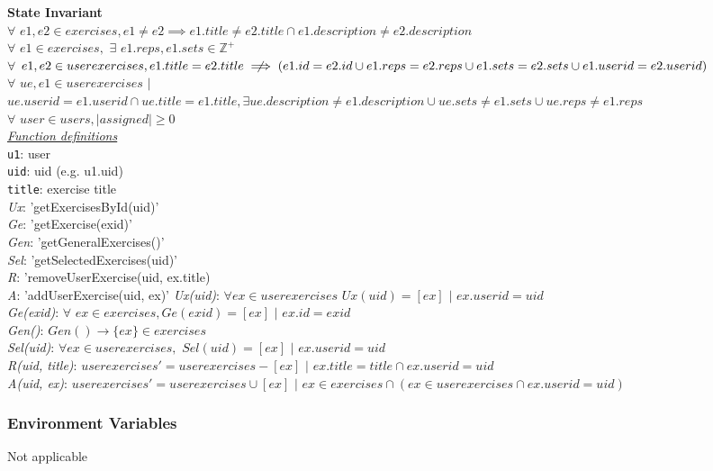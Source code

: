 \documentclass[12pt, titlepage]{article}
\begin{document}
\noindent \textbf{State Invariant} \\
$\forall$ $e1, e2 \in exercises, e1 \neq e2 \implies e1.title \neq e2. title \cap e1.description \neq e2.description$ \\
$\forall$ $e1 \in exercises,$ $\exists$ $e1.reps, e1.sets \in \mathbb{Z}^{+}$ \\
$\forall$ $e1, e2 \in userexercises, e1.title = e2.title \centernot \implies (e1.id = e2.id \cup 
e1.reps = e2.reps \cup e1.sets = e2.sets \cup e1.userid = e2.userid)$ \\
$\forall$ $ue, e1 \in userexercises$ $|$ $ue.userid = e1.userid \cap ue.title = e1.title, \exists ue.description \neq e1.description
\cup ue.sets \neq e1.sets \cup ue.reps \neq e1.reps$ \\
$\forall$ $user \in users, |assigned| \geq 0$ \\
\textit{\underline{Function definitions}}\\
\texttt{u1}: user\\
\texttt{uid}: uid (e.g. u1.uid)\\
\texttt{title}: exercise title \\
\textit{Ux}: 'getExercisesById(uid)'\\
\textit{Ge}: 'getExercise(exid)'\\
\textit{Gen}: 'getGeneralExercises()'\\
\textit{Sel}: 'getSelectedExercises(uid)'\\
\textit{R}: 'removeUserExercise(uid, ex.title)\\
\textit{A}: 'addUserExercise(uid, ex)'
\textit{Ux(uid)}: $\forall ex \in userexercises$ $Ux(uid) = [ex]$ $|$ $ex.userid = uid$\\
\textit{Ge(exid)}: $\forall$ $ex \in exercises, Ge(exid) = [ex]$ $|$ $ex.id = exid$\\ 
\textit{Gen()}: $Gen() \rightarrow \{ex\} \in exercises$ \\
\textit{Sel(uid)}: $\forall ex \in userexercises,$ $Sel(uid) = [ex]$ $|$ $ex.userid = uid$\\
\textit{R(uid, title)}: $userexercises' = userexercises - [ex]$ $|$ $ex.title = title \cap ex.userid = uid$\\
\textit{A(uid, ex)}: $userexercises' = userexercises \cup [ex]$ $|$ $ex \in exercises \cap (ex \in userexercises \cap ex.userid = uid) $ \\

\subsubsection{Environment Variables} 
Not applicable
\end{document}
